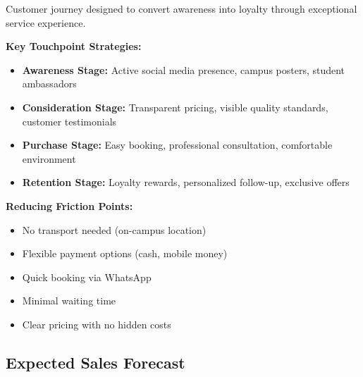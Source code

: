 \begin{center}

\vspace{0.5em}
Customer journey designed to convert awareness into loyalty through exceptional service experience.
\end{center}

\vspace{1em}

\begin{tcolorbox}[mybox, title=\textbf{Customer Journey Optimization}]
\textbf{Key Touchpoint Strategies:}
\begin{itemize}[leftmargin=1em, itemsep=0pt]
    \item \textbf{Awareness Stage:} Active social media presence, campus posters, student ambassadors
    \item \textbf{Consideration Stage:} Transparent pricing, visible quality standards, customer testimonials
    \item \textbf{Purchase Stage:} Easy booking, professional consultation, comfortable environment
    \item \textbf{Retention Stage:} Loyalty rewards, personalized follow-up, exclusive offers
\end{itemize}

\textbf{Reducing Friction Points:}
\begin{itemize}[leftmargin=1em, itemsep=0pt]
    \item No transport needed (on-campus location)
    \item Flexible payment options (cash, mobile money)
    \item Quick booking via WhatsApp
    \item Minimal waiting time
    \item Clear pricing with no hidden costs
\end{itemize}
\end{tcolorbox}

\subsection{Expected Sales Forecast}

